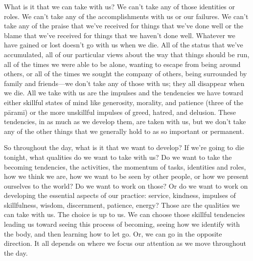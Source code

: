 What is it that we can take with us? We can't take any of those 
identities or roles. We can't take any of the accomplishments with us 
or our failures. We can't take any of the praise that we've received 
for things that we've done well or the blame that we've received for 
things that we haven't done well. Whatever we have gained or lost 
doesn't go with us when we die. All of the status that we've 
accumulated, all of our particular views about the way that things 
should be run, all of the times we were able to be alone, wanting to 
escape from being around others, or all of the times we sought the 
company of others, being surrounded by family and friends---we don't 
take any of those with us; they all disappear when we die. All we take 
with us are the impulses and the tendencies we have toward either 
skillful states of mind like generosity, morality, and patience (three 
of the pāramī) or the more unskillful impulses of greed, hatred, and 
delusion. These tendencies, in as much as we develop them, are taken 
with us, but we don't take any of the other things that we generally 
hold to as so important or permanent.

So throughout the day, what is it that we want to develop? If we're 
going to die tonight, what qualities do we want to take with us? Do we 
want to take the becoming tendencies, the activities, the momentum of 
tasks, identities and roles, how we think we are, how we want to be 
seen by other people, or how we present ourselves to the world? Do we 
want to work on those? Or do we want to work on developing the 
essential aspects of our practice: service, kindness, impulses of 
skillfulness, wisdom, discernment, patience, energy? Those are the 
qualities we can take with us. The choice is up to us. We can choose 
those skillful tendencies leading us toward seeing this process of 
becoming, seeing how we identify with the body, and then learning how 
to let go. Or, we can go in the opposite direction. It all depends on 
where we focus our attention as we move throughout the day.

